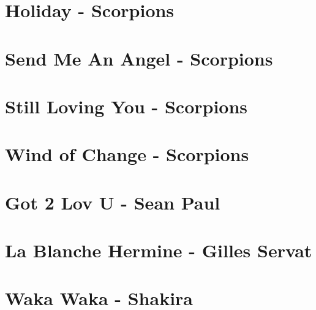 \documentclass[11pt]{article}
\begin{document}
\section*{Holiday - Scorpions}
\begin{guitar}

\end{guitar}

\section{Send Me An Angel - Scorpions}
\begin{guitar}

\end{guitar}


\section{Still Loving You - Scorpions}
\begin{guitar}

\end{guitar}

\section*{Wind of Change - Scorpions}
\begin{guitar}

\end{guitar}

\section{Got 2 Lov U - Sean Paul}
\begin{guitar}

\end{guitar}



\section{La Blanche Hermine - Gilles Servat}
\begin{guitar}

\end{guitar}

\section{Waka Waka - Shakira}
\begin{guitar}

\end{guitar}
\end{document}
